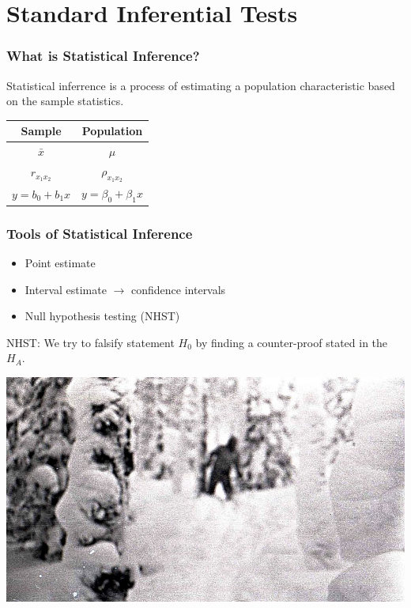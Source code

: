 \documentclass[12pt]{beamer}\usepackage[]{graphicx}\usepackage[]{color}
\begin{document}

\section{Standard Inferential Tests}

\begin{frame}\Large
\frametitle{What is Statistical Inference?}

\large{Statistical inferrence is a process of estimating a population characteristic based on the sample statistics.} \bigskip

\centering\begin{tabular}{c|c}
Sample &  Population \\ \hline 
$\bar{x}$ & $\mu$ \\ 
$r_{x_1x_2}$ & $\rho_{x_1x_2}$ \\ 
$y=b_0+b_1x$ & $y=\beta_0+\beta_1x$
\end{tabular} 

\end{frame}


\begin{frame}\large
\frametitle{Tools of Statistical Inference}

\begin{itemize}
 \item Point estimate
 \item Interval estimate $\rightarrow$ confidence intervals
 \item Null hypothesis testing (NHST)
\end{itemize}

 NHST: We try to falsify statement $H_0$ by finding a counter-proof stated in the $H_A$. 

\end{frame}


    
    \begin{frame}[plain]
   \hspace*{-1.1cm} \includegraphics[height=\paperheight,width=\paperwidth]{./Images/yetti}
    \end{frame}
    
\end{document}
